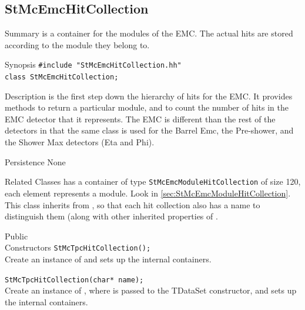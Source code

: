 \subsection{StMcEmcHitCollection}
 
\label{sec:StMcEmcHitCollection}
\begin{Entry}
\item[Summary]
     is a container for the
    modules of the EMC.  The actual hits are stored according to
    the module they belong to.

\item[Synopsis]
    \verb+#include "StMcEmcHitCollection.hh"+\\
    \verb+class StMcEmcHitCollection;+\\

\item[Description]
     is the first step down
    the hierarchy of hits for the EMC.  It provides
    methods to return a particular module, and to
    count the number of hits in the EMC detector that it
    represents.  The EMC is different than the rest of the
    detectors in that the same class is used for the Barrel Emc,
    the Pre-shower, and the Shower Max detectors (Eta and Phi).

\item[Persistence]
    None

\item[Related Classes]
    has a container of type {\tt StMcEmcModuleHitCollection}
    of size 120, each element represents a module.  Look in
     \ref{sec:StMcEmcModuleHitCollection}.
    This class inherits from , so that each hit collection
    also has a name to distinguish them (along with other inherited properties
    of .

\item[Public\\ Constructors]
    \verb+StMcTpcHitCollection();+\\
    Create an instance of 
    and sets up the internal containers.

    \verb+StMcTpcHitCollection(char* name);+\\
    Create an instance of , where  is passed to the
    TDataSet constructor, 
    and sets up the internal containers.


\end{Entry}
